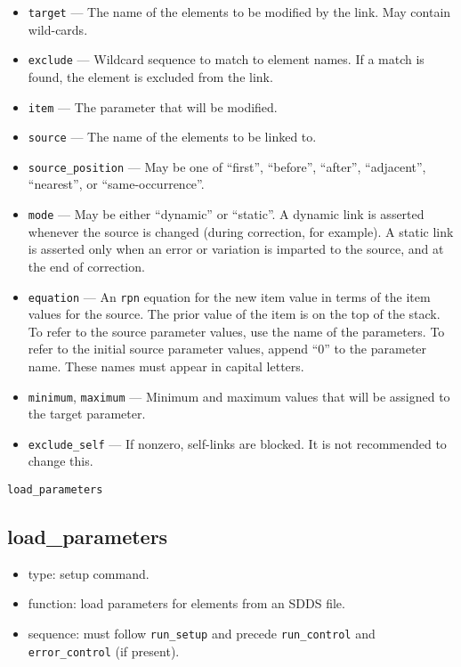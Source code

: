 \documentclass[11pt]{article}
\begin{document}
\begin{itemize}
\item \verb|target| --- The name of the elements to be modified by the link.  May contain
 wild-cards.
\item \verb|exclude| --- Wildcard sequence to match to element names.  If a match is found,
 the element is excluded from the link.
\item \verb|item| --- The parameter that will be modified.
\item \verb|source| --- The name of the elements to be linked to.
\item \verb|source_position| --- May be one of ``first'', ``before'', ``after'', 
``adjacent'', ``nearest'', or ``same-occurrence''.
\item \verb|mode| --- May be either ``dynamic'' or ``static''.  A dynamic link
is asserted whenever the source is changed (during correction, for example).  
A static link is asserted only when an error or variation is imparted to
the source, and at the end of correction.
\item \verb|equation| --- An {\tt rpn} equation for the new item value in
terms of the item values for the source.  The prior value of the item is 
on the top of the stack. To refer to the source
parameter values, use the name of the parameters. To refer to the initial source
parameter values, append ``0'' to the parameter name.  These names must appear
in capital letters.  
\item \verb|minimum|, \verb|maximum| --- Minimum and maximum values that will be
assigned to the target parameter.
\item \verb|exclude_self| --- If nonzero, self-links are blocked. It is not recommended to change this.
\end{itemize}

\newpage
\begin{center}{\Large\verb|load_parameters|}\end{center}
\subsection{load\_parameters \label{subsec:loadparameters}}

\begin{itemize}
\item type: setup command.
\item function: load parameters for elements from an SDDS file.
\item sequence: must follow \verb|run_setup| and precede \verb|run_control| and \verb|error_control| (if present).
\end{itemize}
\end{document}
